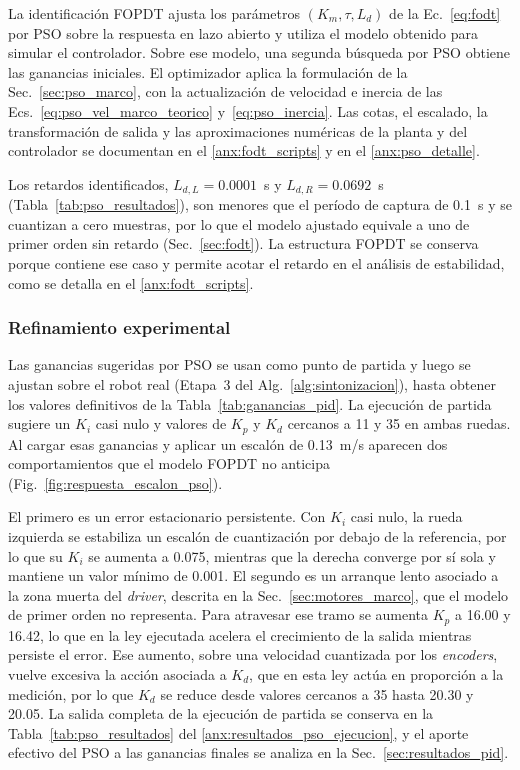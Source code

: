 La identificación FOPDT ajusta los parámetros $(K_m,\tau,L_d)$ de la
Ec.~\eqref{eq:fodt} por PSO sobre la respuesta en lazo abierto y utiliza el
modelo obtenido para simular el controlador. Sobre ese modelo, una segunda
búsqueda por PSO obtiene las ganancias iniciales. El optimizador aplica la
formulación de la Sec.~\ref{sec:pso_marco}, con la actualización de velocidad
e inercia de las Ecs.~\eqref{eq:pso_vel_marco_teorico}
y~\eqref{eq:pso_inercia}. Las cotas, el escalado, la transformación de salida y
las aproximaciones numéricas de la planta y del controlador se documentan en el
\ref{anx:fodt_scripts} y en el \ref{anx:pso_detalle}.

Los retardos identificados, $L_{d,L}=0.0001$~s y $L_{d,R}=0.0692$~s
(Tabla~\ref{tab:pso_resultados}), son menores que el período de captura de
0.1~s y se cuantizan a cero muestras, por lo que el modelo ajustado equivale a
uno de primer orden sin retardo (Sec.~\ref{sec:fodt}). La estructura FOPDT se
conserva porque contiene ese caso y permite acotar el retardo en el análisis de
estabilidad, como se detalla en el \ref{anx:fodt_scripts}.

\subsubsection{Refinamiento experimental}
\label{subsec:refinamiento_iterativo}

Las ganancias sugeridas por PSO se usan como punto de partida y luego se
ajustan sobre el robot real (Etapa~3 del
Alg.~\ref{alg:sintonizacion}), hasta obtener los valores definitivos de la
Tabla~\ref{tab:ganancias_pid}. La ejecución de partida sugiere un $K_i$ casi
nulo y valores de $K_p$ y $K_d$ cercanos a 11 y 35 en ambas ruedas. Al cargar esas ganancias y aplicar un escalón de
0.13~m/s aparecen dos comportamientos que el modelo FOPDT no anticipa
(Fig.~\ref{fig:respuesta_escalon_pso}).

El primero es un error estacionario persistente. Con $K_i$ casi nulo, la rueda
izquierda se estabiliza un escalón de cuantización por debajo de la
referencia, por lo que su $K_i$ se aumenta a 0.075, mientras que la derecha
converge por sí sola y mantiene un valor mínimo de 0.001. El segundo es un arranque lento asociado a la
zona muerta del \textit{driver}, descrita en la Sec.~\ref{sec:motores_marco}, que el
modelo de primer orden no representa. Para atravesar ese tramo se aumenta
$K_p$ a 16.00 y 16.42, lo que en la ley ejecutada acelera el crecimiento de la
salida mientras persiste el error. Ese aumento, sobre una velocidad cuantizada por los \textit{encoders},
vuelve excesiva la acción asociada a $K_d$, que en esta ley actúa en
proporción a la medición, por lo que $K_d$ se reduce desde valores cercanos a
35 hasta 20.30 y 20.05. La salida completa de la
ejecución de partida se conserva en la Tabla~\ref{tab:pso_resultados} del
\ref{anx:resultados_pso_ejecucion}, y el aporte efectivo del PSO a las
ganancias finales se analiza en la Sec.~\ref{sec:resultados_pid}.

